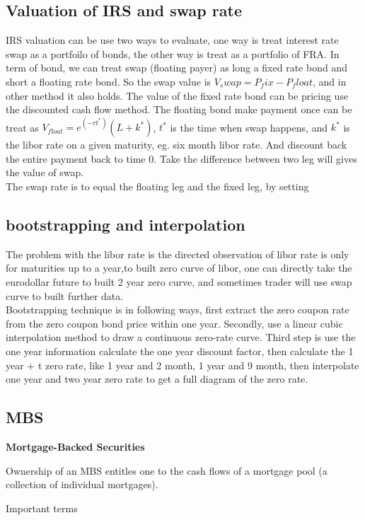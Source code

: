\documentclass[a4paper,11pt]{article}
\begin{document}
\subsection{Valuation of IRS and swap rate}
IRS valuation can be use two ways to evaluate, one way is treat interest rate swap as a portfoilo of bonds, the other way is treat as a portfolio of FRA. In term of bond, we can treat swap (floating payer) as long a fixed rate bond and short a floating rate bond. So the swap value is $V_swap=P_fix-P_float$, and in other method it also holds. The value of the fixed rate bond can be pricing use the discounted cash flow method. The floating bond make payment once can be treat as $ V_{float}=e^{(-rt^*)}(L+k^*)$, $t^*$ is the time when swap happens, and $k^*$ is the libor rate on a given maturity, eg. six month libor rate. And discount back the entire payment back to time 0. Take the difference between two leg will gives the value of swap.\\
The swap rate is to equal the floating leg and the fixed leg, by setting
\subsection{bootstrapping and interpolation}
The problem with the libor rate is the directed observation of libor rate is only for maturities up to a year,to built zero curve of libor, one can directly take the eurodollar future to built 2 year zero curve, and sometimes trader will use swap curve to built further data.\\
Bootstrapping technique is in following ways, first extract the zero coupon rate from the zero coupon bond price within one year. Secondly, use a linear cubic interpolation method to draw a continuous zero-rate curve. Third step is use the one year information calculate the one year discount factor, then calculate the 1 year + t zero rate, like 1 year and 2 month, 1 year and 9 month, then interpolate one year and two year zero rate to get a full diagram of the zero rate. \\

\subsection{MBS}
{\bf Mortgage-Backed Securities}

Ownership of an MBS entitles one to the cash flows of a mortgage
pool (a collection of individual mortgages).

Important terms
\end{document}
